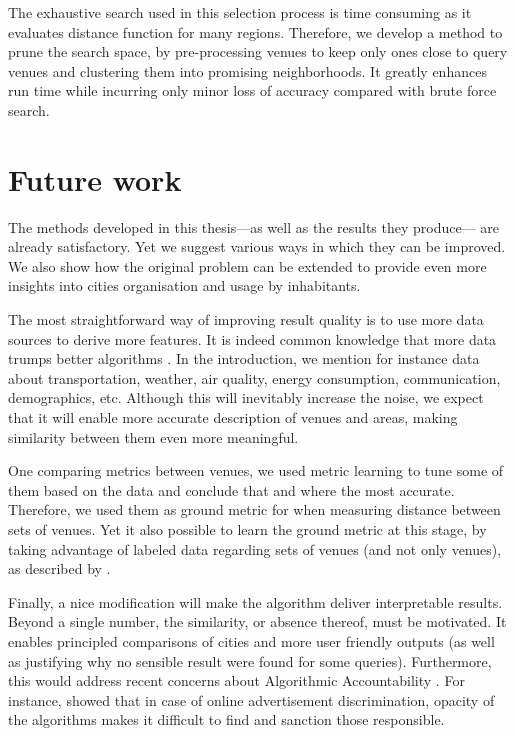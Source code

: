 The exhaustive search used in this selection process is time consuming as it
evaluates distance function for many regions.  Therefore, we develop a method
to prune the search space, by pre-processing venues to keep only ones close to
query venues and clustering them into promising neighborhoods. It greatly
enhances run time while incurring only minor loss of accuracy compared with
brute force search.

\section{Future work}
\label{sec:cfuture}

The methods developed in this thesis---as well as the results they produce---
are already satisfactory. Yet we suggest various ways in which they can be
improved. We also show how the original problem can be extended to provide
even more insights into cities organisation and usage by inhabitants.

\medskip

The most straightforward way of improving result quality is to use more data
sources to derive more features. It is indeed common knowledge that more data
trumps better algorithms \autocite{MoreData09}. In the introduction, we mention
for instance data about transportation, weather, air quality, energy
consumption, communication, demographics, etc. Although this will inevitably
increase the noise, we expect that it will enable more accurate description of
venues and areas, making similarity between them even more meaningful.

One comparing metrics between venues, we used metric learning to tune some of
them based on the data and conclude that \eucl{} and \lmnn{} where the most
accurate. Therefore, we used them as ground metric for \emd{} when measuring
distance between sets of venues. Yet it also possible to learn the ground
metric at this stage, by taking advantage of labeled data regarding sets of
venues (and not only venues), as described by \textcite{LearnEMD14}.

Finally, a nice modification will make the algorithm deliver interpretable
results. Beyond a single number, the similarity, or absence thereof, must be
motivated. It enables principled comparisons of cities and more user friendly
outputs (as well as justifying why no sensible result were found for some
queries).  Furthermore, this would address recent concerns about Algorithmic
Accountability \autocite{Accountability13}. For instance,
\textcite{Discrimination13} showed that in case of online advertisement
discrimination, opacity of the algorithms makes it difficult to find and
sanction those responsible.

